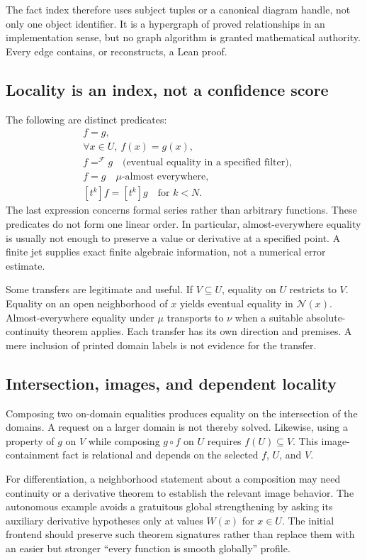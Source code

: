 \documentclass[11pt,a4paper]{article}
\theoremstyle{plain}
\theoremstyle{definition}
\theoremstyle{remark}
\begin{document}
The fact index therefore uses subject tuples or a canonical diagram handle,
not only one object identifier. It is a hypergraph of proved relationships in
an implementation sense, but no graph algorithm is granted mathematical
authority. Every edge contains, or reconstructs, a Lean proof.

\subsection{Locality is an index, not a confidence score}
The following are distinct predicates:
\begin{align*}
 &f=g,\\
 &\forall x\in U,\ f(x)=g(x),\\
 &f=^{\mathcal F}g\quad\text{(eventual equality in a specified filter)},\\
 &f=g\quad\mu\text{-almost everywhere},\\
 &[t^k]f=[t^k]g\quad\text{for }k<N.
\end{align*}
The last expression concerns formal series rather than arbitrary functions.
These predicates do not form one linear order. In particular, almost-everywhere
equality is usually not enough to preserve a value or derivative at a
specified point. A finite jet supplies exact finite algebraic information,
not a numerical error estimate.

Some transfers are legitimate and useful. If $V\subseteq U$, equality on $U$
restricts to $V$. Equality on an open neighborhood of $x$ yields eventual
equality in $\mathcal N(x)$. Almost-everywhere equality under $\mu$ transports
to $\nu$ when a suitable absolute-continuity theorem applies. Each transfer
has its own direction and premises. A mere inclusion of printed domain labels
is not evidence for the transfer.

\subsection{Intersection, images, and dependent locality}
Composing two on-domain equalities produces equality on the intersection of
the domains. A request on a larger domain is not thereby solved. Likewise,
using a property of $g$ on $V$ while composing $g\circ f$ on $U$ requires
$f(U)\subseteq V$. This image-containment fact is relational and depends on
the selected $f$, $U$, and $V$.

For differentiation, a neighborhood statement about a composition may need
continuity or a derivative theorem to establish the relevant image behavior.
The autonomous example avoids a gratuitous global strengthening by asking its
auxiliary derivative hypotheses only at values $W(x)$ for $x\in U$.
The initial frontend should preserve such theorem signatures rather than
replace them with an easier but stronger ``every function is smooth globally''
profile.
\end{document}
